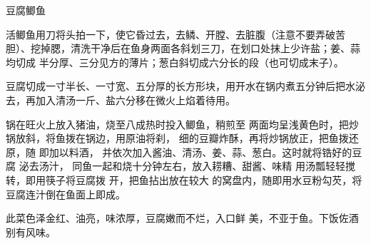\begin{recipe}{豆腐鲫鱼}

\ingredients


\cooking

\step 活鲫鱼用刀将头拍一下，使它昏过去，去鳞、开膛、去脏腹（注意不要弄破苦
胆）、挖掉腮，清洗干净后在鱼身两面各斜划三刀，在划口处抹上少许盐；姜、蒜均切成
半分厚、三分见方的薄片；葱白斜切成六分长的段（也可切成末子）。

\step 豆腐切成一寸半长、一寸宽、五分厚的长方形块，用开水在锅内煮五分钟后把水泌
去，再加入清汤一斤、盐六分移在微火上焰着待用。

\step 锅在旺火上放入猪油，烧至八成热时投入鲫鱼，稍煎至 两面均呈浅黄色时，把炒
锅放斜，将鱼拨在锅边，用原油将刹， 细的豆瓣炸酥，再将炒锅放正，把鱼拨还原，随
即加以料酒， 并依次加入酱油、清汤、姜、蒜、葱白。这时就将锆好的豆腐 泌去汤汁，
同鱼一起和烧十分钟左右，放入耢糟、甜酱、味精 用汤瓢轻轻搅转，即用筷子将豆腐拨
开，把鱼拈出放在较大 的窝盘内，随即用水豆粉勾芡，将豆腐连汁倒在鱼面上即成。

\features

此菜色泽金红、油亮，味浓厚，豆腐嫩而不烂，入口鲜 美，不亚于鱼。下饭佐酒别有风味。

\end{recipe}


